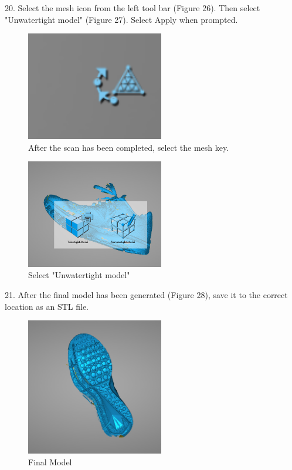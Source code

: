 20. Select the mesh icon from the left tool bar (Figure 26). Then select "Unwatertight model" (Figure 27). Select Apply when prompted.

\begin{figure}[!htp]
\centering
\includegraphics[width=6cm]{Meld}
\caption{After the scan has been completed, select the mesh key.}
\label{Image 26}
\end{figure}

\begin{figure}[!htp]
\centering
\includegraphics[width=6cm]{WAter}
\caption{Select "Unwatertight model"}
\label{Image 27}
\end{figure}

\newpage


21. After the final model has been generated (Figure 28), save it to the correct location as an STL file. 

\begin{figure}[!htp]
\centering
\includegraphics[width=6cm]{Final}
\caption{Final Model}
\label{Image 28}
\end{figure}


